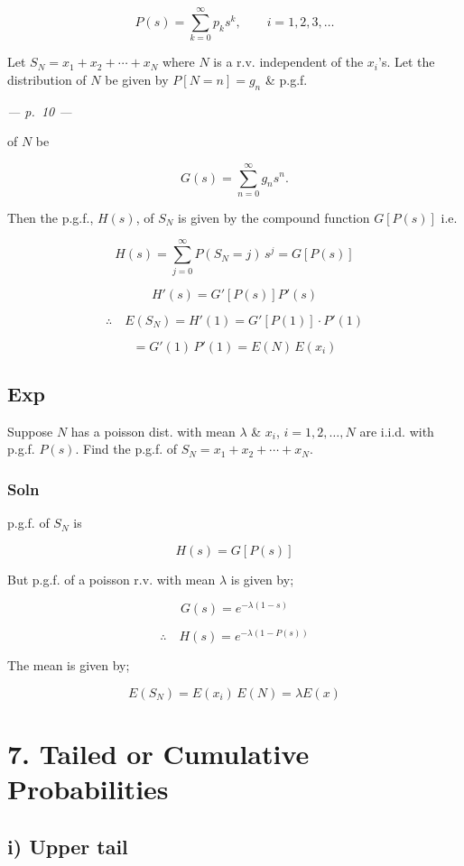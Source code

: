 \documentclass[
]{article}
\begin{document}
\[P(s) = \sum_{k=0}^{\infty} p_k s^k, \qquad i = 1, 2, 3, \ldots\]

Let \(S_N = x_1 + x_2 + \cdots + x_N\) where \(N\) is a r.v. independent
of the \(x_i\)'s. Let the distribution of \(N\) be given by
\(P[N = n] = g_n\) \& p.g.f.

\emph{--- p.~10 ---}

of \(N\) be

\[G(s) = \sum_{n=0}^{\infty} g_n s^n.\]

Then the p.g.f., \(H(s)\), of \(S_N\) is given by the compound function
\(G\left[P(s)\right]\) i.e.

\[H(s) = \sum_{j=0}^{\infty} P(S_N = j)\, s^j = G\left[P(s)\right]\]

\[H'(s) = G'\left[P(s)\right] P'(s)\]

\[\therefore \quad E(S_N) = H'(1) = G'\left[P(1)\right] \cdot P'(1)\]

\[= G'(1)\, P'(1) = E(N)\, E(x_i)\]

\subsection{Exp}\label{exp-6}

Suppose \(N\) has a poisson dist. with mean \(\lambda\) \& \(x_i\),
\(i = 1, 2, \ldots, N\) are i.i.d. with p.g.f. \(P(s)\). Find the p.g.f.
of \(S_N = x_1 + x_2 + \cdots + x_N\).

\subsubsection{Soln}\label{soln-3}

p.g.f. of \(S_N\) is

\[H(s) = G\left[P(s)\right]\]

But p.g.f. of a poisson r.v. with mean \(\lambda\) is given by;

\[G(s) = e^{-\lambda(1-s)}\]

\[\therefore \quad H(s) = e^{-\lambda\left(1 - P(s)\right)}\]

The mean is given by;

\[E(S_N) = E(x_i)\, E(N) = \lambda E(x)\]

\section{7. Tailed or Cumulative
Probabilities}\label{tailed-or-cumulative-probabilities}

\subsection{i) Upper tail}\label{i-upper-tail}
\end{document}
